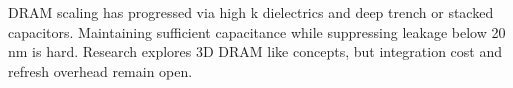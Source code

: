 DRAM scaling has progressed via high k dielectrics and deep trench or stacked capacitors. Maintaining sufficient capacitance while suppressing leakage below 20 nm is hard. Research explores 3D DRAM like concepts, but integration cost and refresh overhead remain open.
